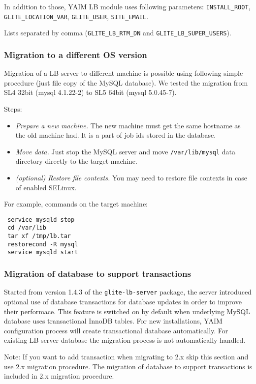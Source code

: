 In addition to those, YAIM LB module uses following parameters:
\texttt{INSTALL\_ROOT}, \texttt{GLITE\_LOCATION\_VAR}, \texttt{GLITE\_USER}, \texttt{SITE\_EMAIL}.

Lists separated by comma (\texttt{GLITE\_LB\_RTM\_DN} and \texttt{GLITE\_LB\_SUPER\_USERS}).

\subsubsection{Migration to a different OS version}
\label{inst:OSmigration}
Migration of a LB server to different machine is possible using
following simple procedure (just file copy of the MySQL database). We
tested the migration from SL4 32bit (mysql 4.1.22-2) to SL5 64bit
(mysql 5.0.45-7).

Steps:
\begin{itemize}
\item \emph{Prepare a new machine.} The new machine must get the same hostname 
 as the old machine had. It is a part of job ids stored in the database.
\item \emph{Move data.} Just stop the MySQL server and move
 \verb'/var/lib/mysql' data directory directly to the target machine.
\item \emph{(optional) Restore file contexts.} You may need to restore file 
 contexts in case of enabled SELinux.
\end{itemize}
For example, commands on the target machine:
 \begin{verbatim}
 service mysqld stop
 cd /var/lib
 tar xf /tmp/lb.tar
 restorecond -R mysql
 service mysqld start
 \end{verbatim}

\subsubsection{Migration of database to support transactions}
Started from version 1.4.3 of the \texttt{glite-lb-server}
package, the \LB server introduced optional use of database
transactions for \LB database updates in order to improve their
performace. This feature is switched on by default when underlying
MySQL database uses transactional InnoDB tables. For new
installations, YAIM configuration process will create transactional
database automatically. For existing LB server database the migration 
process is not automatically handled.

Note: If you want to add transaction when migrating to \LB 2.x skip
this section and use \LB 2.x migration procedure. The migration of
database to support transactions is included in \LB 2.x migration procedure.

